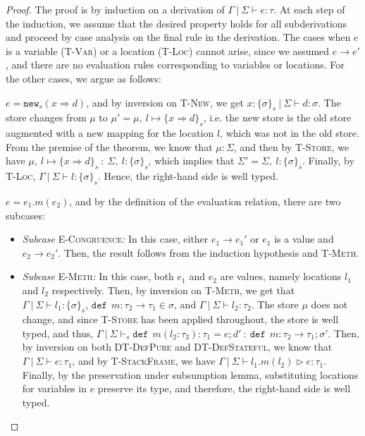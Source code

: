 \documentclass{llncs}
\newcommand{\keywadj}[1]{\mathtt{#1}}
\newcommand{\keyw}[1]{\keywadj{#1}~}
\newcommand{\pcase}[1][]{
  \if\relax\detokenize{#1}\relax
    \def\thiscase{}
  \else
    \def\thiscase{~#1}
  \fi
  \item
}
\begin{document}
\begin{proof} The proof is by induction on a derivation of $\Gamma~|~\Sigma \vdash e : \tau$. At each step of the induction, we assume that the desired property holds for all subderivations and proceed by case analysis on the final rule in the derivation. The cases when $e$ is a variable (\textsc{T-Var}) or a location (\textsc{T-Loc}) cannot arise, since we assumed $e \longrightarrow e'$, and there are no evaluation rules corresponding to variables or locations. For the other cases, we argue as follows:

\begin{pcases}
\pcase[\textsc{T-New}]
$e = \keywadj{new}_{s}(x \Rightarrow d)$, and by inversion on \textsc{T-New}, we get $x : \{ \sigma \}_{s}~|~\Sigma \vdash d : \sigma$. The store changes from $\mu$ to $\mu' = \mu,~l \mapsto \{ x \Rightarrow d \}_s$, i.e. the new store is the old store augmented with a new mapping for the location $l$, which was not in the old store. From the premise of the theorem, we know that $\mu : \Sigma$, and then by \textsc{T-Store}, we have $\mu,~l \mapsto \{ x \Rightarrow d \}_s~:~\Sigma,~l : \{ \sigma \}_s$, which implies that $\Sigma' = \Sigma,~l : \{ \sigma \}_s$. Finally, by \textsc{T-Loc}, $\Gamma~|~\Sigma \vdash l : \{ \sigma \}_s$. Hence, the right-hand side is well typed.
\\
\pcase[\textsc{T-Meth}]
$e = e_1.m(e_2)$, and by the definition of the evaluation relation, there are two subcases:
\\
\begin{itemize}
\item[]  \textit{Subcase} \textsc{E-Congruence}\textit{:} In this case, either $e_1 \longrightarrow e_1'$ or $e_1$ is a value and $e_2 \longrightarrow e_2'$. Then, the result follows from the induction hypothesis and \textsc{T-Meth}.
\\
\item[]  \textit{Subcase} \textsc{E-Meth}\textit{:} In this case, both $e_1$ and $e_2$ are values, namely locations $l_1$ and $l_2$ respectively. Then, by inversion on \textsc{T-Meth}, we get that $\Gamma~|~\Sigma \vdash l_1 : \{\sigma\}_s$, $\keyw{def}~ m : \tau_2 \rightarrow \tau_1 \in \sigma$, and $\Gamma~|~\Sigma \vdash l_2 : \tau_2$. The store $\mu$ does not change, and since \textsc{T-Store} has been applied throughout, the store is well typed, and thus, \mbox{$\Gamma~|~\Sigma \vdash_s \keyw{def}~ m(l_2 : \tau_2) : \tau_1 = e; d'~:~\keyw{def}~ m : \tau_2 \rightarrow \tau_1; \sigma'$}. Then, by inversion on both \textsc{DT-DefPure} and \textsc{DT-DefStateful}, we know that $\Gamma~|~\Sigma \vdash e : \tau_1$, and by \textsc{T-StackFrame}, we have $\Gamma~|~\Sigma \vdash l_1.m(l_2) \rhd e : \tau_1$. Finally, by the preservation under subsumption lemma, substituting locations for variables in $e$ preserve its type, and therefore, the right-hand side is well typed.
\\
\end{itemize}


\end{pcases}
\end{proof}
\end{document}
